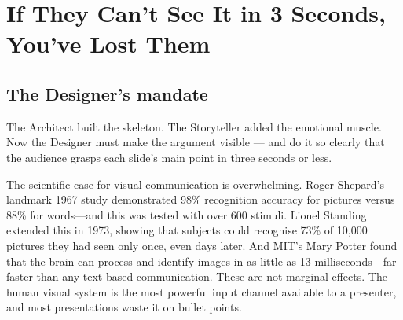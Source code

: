 
\section{If They Can't See It in 3 Seconds, You've Lost Them}



\subsection{The Designer's mandate}

The Architect built the skeleton. The Storyteller added the emotional muscle. Now the Designer must make the argument visible --- and do it so clearly that the audience grasps each slide's main point in three seconds or less.

The scientific case for visual communication is overwhelming. Roger Shepard's landmark 1967 study demonstrated 98\% recognition accuracy for pictures versus 88\% for words---and this was tested with over 600 stimuli. Lionel Standing extended this in 1973, showing that subjects could recognise 73\% of 10,000 pictures they had seen only once, even days later. And MIT's Mary Potter found that the brain can process and identify images in as little as 13 milliseconds---far faster than any text-based communication. These are not marginal effects. The human visual system is the most powerful input channel available to a presenter, and most presentations waste it on bullet points.

